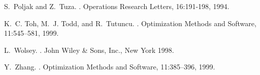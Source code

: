 \documentclass[12pt]{article}
\begin{document}
\begin{thebibliography}{10}
S.~Poljak and Z.~Tuza.
.
\newblock Operations Research Letters, 16:191-198, 1994.

K.~C. Toh, M.~J. Todd, and R.~Tutuncu.
.
\newblock Optimization Methods and Software, 11:545--581, 1999.

L.~Wolsey.
.
\newblock John Wiley \& Sons, Inc., New York 1998.

Y.~Zhang.
.
\newblock Optimization Methods and Software, 11:385--396, 1999.

\end{thebibliography}
\end{document}
